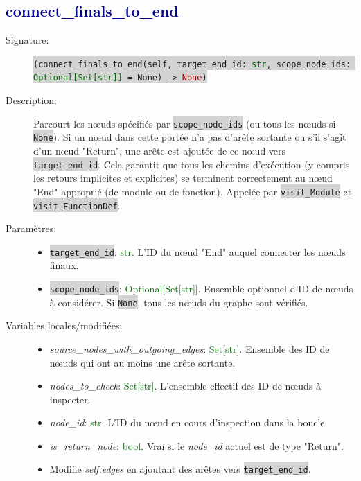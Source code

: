 \documentclass[11pt,a4paper]{article}
\newcommand{\code}[1]{\colorbox{lightgray}{\texttt{\small #1}}}
\newcommand{\var}[1]{\textit{#1}}
\newcommand{\vartype}[1]{\textcolor{darkgreen}{#1}}
\newcommand{\methodname}[1]{\textbf{\textcolor{darkblue}{#1}}}
\newcommand{\param}[1]{\code{#1}}
\newcommand{\rettype}[1]{\textcolor{darkred}{#1}}
\begin{document}
\subsection*{\methodname{connect\_finals\_to\_end}}
\begin{description}
    \item[Signature:] \code{(connect\_finals\_to\_end(self, target\_end\_id: \vartype{str}, scope\_node\_ids: \vartype{Optional[Set[str]]} = None) -> \rettype{None})}
    \item[Description:] Parcourt les nœuds spécifiés par \param{scope\_node\_ids} (ou tous les nœuds si \code{None}). Si un nœud dans cette portée n'a pas d'arête sortante ou s'il s'agit d'un nœud "Return", une arête est ajoutée de ce nœud vers \param{target\_end\_id}. Cela garantit que tous les chemins d'exécution (y compris les retours implicites et explicites) se terminent correctement au nœud "End" approprié (de module ou de fonction). Appelée par \code{visit\_Module} et \code{visit\_FunctionDef}.
    \item[Paramètres:]
    \begin{itemize}
        \item \param{target\_end\_id}: \vartype{str}. L'ID du nœud "End" auquel connecter les nœuds finaux.
        \item \param{scope\_node\_ids}: \vartype{Optional[Set[str]]}. Ensemble optionnel d'ID de nœuds à considérer. Si \code{None}, tous les nœuds du graphe sont vérifiés.
    \end{itemize}
    \item[Variables locales/modifiées:]
    \begin{itemize}
        \item \var{source\_nodes\_with\_outgoing\_edges}: \vartype{Set[str]}. Ensemble des ID de nœuds qui ont au moins une arête sortante.
        \item \var{nodes\_to\_check}: \vartype{Set[str]}. L'ensemble effectif des ID de nœuds à inspecter.
        \item \var{node\_id}: \vartype{str}. L'ID du nœud en cours d'inspection dans la boucle.
        \item \var{is\_return\_node}: \vartype{bool}. Vrai si le \var{node\_id} actuel est de type "Return".
        \item Modifie \var{self.edges} en ajoutant des arêtes vers \param{target\_end\_id}.
    \end{itemize}
\end{description}
\end{document}
